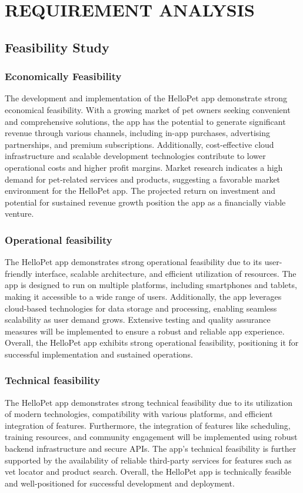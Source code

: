 
\section{REQUIREMENT ANALYSIS}

\subsection{Feasibility Study}
\subsubsection{Economically Feasibility}
The development and implementation of the HelloPet app demonstrate strong economical feasibility. With a growing market of pet owners seeking convenient and comprehensive solutions, the app has the potential to generate significant revenue through various channels, including in-app purchases, advertising partnerships, and premium subscriptions. Additionally, cost-effective cloud infrastructure and scalable development technologies contribute to lower operational costs and higher profit margins. Market research indicates a high demand for pet-related services and products, suggesting a favorable market environment for the HelloPet app. The projected return on investment and potential for sustained revenue growth position the app as a financially viable venture.

\subsubsection{Operational feasibility}
The HelloPet app demonstrates strong operational feasibility due to its user-friendly interface, scalable architecture, and efficient utilization of resources. The app is designed to run on multiple platforms, including smartphones and tablets, making it accessible to a wide range of users. Additionally, the app leverages cloud-based technologies for data storage and processing, enabling seamless scalability as user demand grows. Extensive testing and quality assurance measures will be implemented to ensure a robust and reliable app experience. Overall, the HelloPet app exhibits strong operational feasibility, positioning it for successful implementation and sustained operations.

\subsubsection{Technical feasibility}
The HelloPet app demonstrates strong technical feasibility due to its utilization of modern technologies, compatibility with various platforms, and efficient integration of features. Furthermore, the integration of features like scheduling, training resources, and community engagement will be implemented using robust backend infrastructure and secure APIs. The app's technical feasibility is further supported by the availability of reliable third-party services for features such as vet locator and product search. Overall, the HelloPet app is technically feasible and well-positioned for successful development and deployment.

